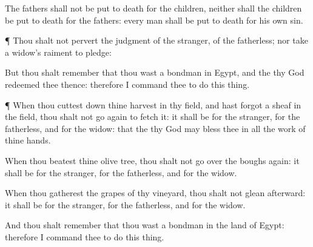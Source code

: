 {The
fathers shall not be put to
death for the
children, neither shall the
children be put to
death for the
fathers: every
man shall be put to
death for his own
sin.


\par }{\PP {}¶ Thou shalt not
pervert the
judgment of the
stranger,
{} of the
fatherless; nor
take a
widow’s
raiment to
pledge:

But thou shalt
remember that thou wast a
bondman in
Egypt, and the
{} thy
God
redeemed thee thence: therefore I
command thee to
do this
thing.


\par }{\PP {}¶ When thou cuttest
down thine
harvest in thy
field, and hast
forgot a
sheaf in the
field, thou shalt not go
again to
fetch it: it shall be for the
stranger, for the
fatherless, and for the
widow: that the
{} thy
God may
bless thee in all the
work of thine
hands.

When thou
beatest thine olive
tree, thou shalt not go over the
boughs
again: it shall be for the
stranger, for the
fatherless, and for the
widow.

When thou
gatherest the grapes of thy
vineyard, thou shalt not
glean
{}
afterward: it shall be for the
stranger, for the
fatherless, and for the
widow.

And thou shalt
remember that thou wast a
bondman in the
land of
Egypt: therefore I
command thee to
do this
thing.




\par }
